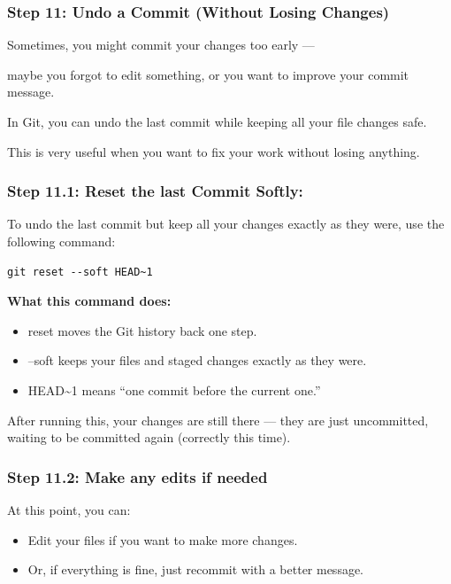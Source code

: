 \documentclass[
  11pt,
  a4paper,
]{article}
\begin{document}
\newpage

\subsubsection{Step 11: Undo a Commit (Without Losing
Changes)}\label{step-11-undo-a-commit-without-losing-changes}

Sometimes, you might commit your changes too early ---

maybe you forgot to edit something, or you want to improve your commit
message.

In Git, you can undo the last commit while keeping all your file changes
safe.

This is very useful when you want to fix your work without losing
anything.

\subsubsection{Step 11.1: Reset the last Commit
Softly:}\label{step-11.1-reset-the-last-commit-softly}

To undo the last commit but keep all your changes exactly as they were,
use the following command:

\begin{verbatim}
git reset --soft HEAD~1
\end{verbatim}

\textbf{What this command does:}

\begin{itemize}
\item
  reset moves the Git history back one step.
\item
  --soft keeps your files and staged changes exactly as they were.
\item
  HEAD\textasciitilde1 means ``one commit before the current one.''
\end{itemize}

After running this, your changes are still there --- they are just
uncommitted, waiting to be committed again (correctly this time).

\subsubsection{Step 11.2: Make any edits if
needed}\label{step-11.2-make-any-edits-if-needed}

At this point, you can:

\begin{itemize}
\item
  Edit your files if you want to make more changes.
\item
  Or, if everything is fine, just recommit with a better message.
\end{itemize}
\end{document}
